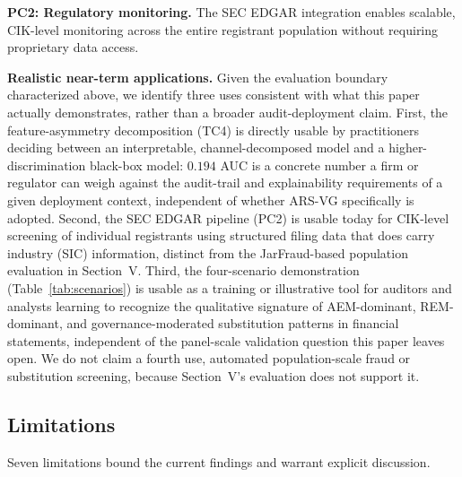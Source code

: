 \documentclass[12pt]{article}
\begin{document}
\textbf{PC2: Regulatory monitoring.}  The SEC EDGAR integration enables
scalable, CIK-level monitoring across the entire registrant population without
requiring proprietary data access.

\textbf{Realistic near-term applications.}  Given the evaluation
boundary characterized above, we identify three uses consistent with
what this paper actually demonstrates, rather than a broader
audit-deployment claim.  First, the feature-asymmetry decomposition
(TC4) is directly usable by practitioners deciding between an
interpretable, channel-decomposed model and a higher-discrimination
black-box model: $0.194$ AUC is a concrete number a firm or regulator
can weigh against the audit-trail and explainability requirements of
a given deployment context, independent of whether ARS-VG specifically
is adopted.  Second, the SEC EDGAR pipeline (PC2) is usable today for
CIK-level screening of individual registrants using structured filing
data that does carry industry (SIC) information, distinct from the
JarFraud-based population evaluation in Section~V.  Third, the
four-scenario demonstration (Table~\ref{tab:scenarios}) is usable as a
training or illustrative tool for auditors and analysts learning to
recognize the qualitative signature of AEM-dominant, REM-dominant, and
governance-moderated substitution patterns in financial statements,
independent of the panel-scale validation question this paper leaves
open.  We do not claim a fourth use, automated population-scale
fraud or substitution screening, because Section~V's evaluation does
not support it.

\subsection*{Limitations}

Seven limitations bound the current findings and warrant explicit
discussion.
\end{document}
